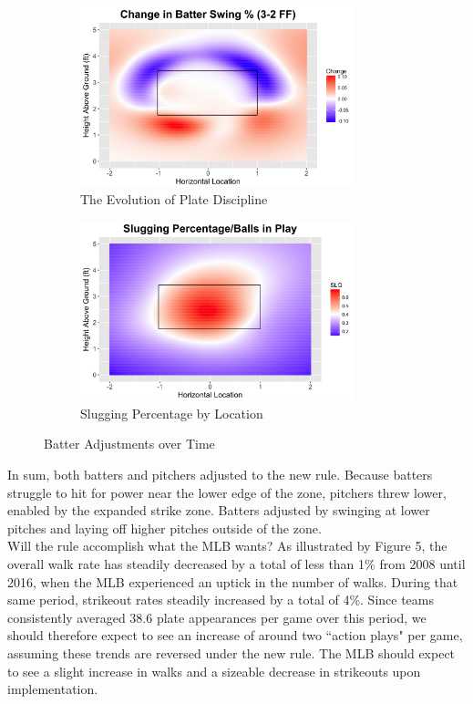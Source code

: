 \documentclass[11pt]{article}
\begin{document}
\begin{figure}[ht]
\centering
\begin{subfigure}[b]{0.48\textwidth}
\centering
\includegraphics[height = 5.2cm]{../Output/fig4a.png}
\caption{The Evolution of Plate Discipline}
\end{subfigure}
\begin{subfigure}[b]{0.48\textwidth}
\centering
\includegraphics[height = 5.2cm]{../Output/fig4b.png}
\caption{Slugging Percentage by Location}
\end{subfigure}
\caption{Batter Adjustments over Time}
\end{figure}

In sum, both batters and pitchers adjusted to the new rule.  Because batters struggle to hit for power near the lower edge of the zone, pitchers threw lower, enabled by the expanded strike zone.  Batters adjusted by swinging at lower pitches and laying off higher pitches outside of the zone.\\

Will the rule accomplish what the MLB wants?  As illustrated by Figure 5, the overall walk rate has steadily decreased by a total of less than 1\% from 2008 until 2016, when the MLB experienced an uptick in the number of walks.  During that same period, strikeout rates steadily increased by a total of 4\%.  Since teams consistently averaged 38.6 plate appearances per game over this period, we should therefore expect to see an increase of around two ``action plays" per game, assuming these trends are reversed under the new rule.  The MLB should expect to see a slight increase in walks and a sizeable decrease in strikeouts upon implementation.
\end{document}
